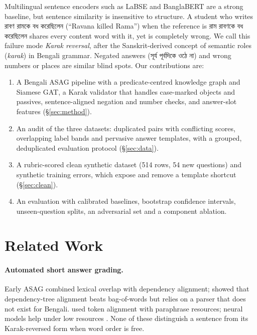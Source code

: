 \documentclass[10pt,a4paper,twocolumn]{article}
\newcommand{\bn}[1]{{\bengalifont #1}}
\begin{document}
Multilingual sentence encoders such as LaBSE \citep{labse} and BanglaBERT
\citep{banglabert} are a strong baseline, but sentence similarity is
insensitive to structure. A student who writes \bn{রাবণ রামকে বধ করেছিলেন}
(``Ravana killed Rama'') when the reference is \bn{রাম রাবণকে বধ করেছিলেন}
shares every content word with it, yet is completely wrong. We call this
failure mode \emph{Karak reversal}, after the Sanskrit-derived concept of
semantic roles (\emph{karak}) in Bengali grammar. Negated answers
(\bn{সূর্য পূর্বদিকে ওঠে না}) and wrong numbers or places are similar blind
spots. Our contributions are:
\begin{enumerate}\setlength{\itemsep}{0pt}
\item A Bengali ASAG pipeline with a predicate-centred knowledge graph and
  Siamese GAT, a Karak validator that handles case-marked objects and
  passives, sentence-aligned negation and number checks, and answer-slot
  features (\S\ref{sec:method}).
\item An audit of the three datasets: duplicated pairs with conflicting
  scores, overlapping label bands and pervasive answer templates, with a
  grouped, deduplicated evaluation protocol (\S\ref{sec:data}).
\item A rubric-scored clean synthetic dataset (514 rows, 54 new questions)
  and synthetic training errors, which expose and remove a template shortcut
  (\S\ref{sec:clean}).
\item An evaluation with calibrated baselines, bootstrap confidence intervals,
  unseen-question splits, an adversarial set and a component ablation.
\end{enumerate}

\section{Related Work}
\paragraph{Automated short answer grading.}
Early ASAG combined lexical overlap with dependency alignment;
\citet{mohler2011} showed that dependency-tree alignment beats bag-of-words
but relies on a parser that does not exist for Bengali. \citet{sultan2016}
used token alignment with paraphrase resources; neural models help under low
resources \citep{riordan2017,horbach2017}. None of these distinguish a
sentence from its Karak-reversed form when word order is free.
\end{document}
